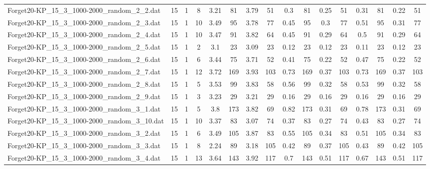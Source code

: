 \begin{sidewaystable}[!ht]
{\begin{tabular}{lccccccccccccccc}
Forget20-KP\_15\_3\_1000-2000\_random\_2\_2.dat & 15 & 1 & 8 & 3.21 & 81 & 3.79 & 51 & 0.3 & 81 & 0.25 & 51 & 0.31 & 81 &  \textcolor{blue2}{0.22} & 51 \\
Forget20-KP\_15\_3\_1000-2000\_random\_2\_3.dat & 15 & 1 & 10 & 3.49 & 95 & 3.78 & 77 & 0.45 & 95 &  \textcolor{blue2}{0.3} & 77 & 0.51 & 95 & 0.31 & 77 \\
Forget20-KP\_15\_3\_1000-2000\_random\_2\_4.dat & 15 & 1 & 10 & 3.47 & 91 & 3.82 & 64 & 0.45 & 91 &  \textcolor{blue2}{0.29} & 64 & 0.5 & 91 &  \textcolor{blue2}{0.29} & 64 \\
Forget20-KP\_15\_3\_1000-2000\_random\_2\_5.dat & 15 & 1 & 2 & 3.1 & 23 & 3.09 & 23 & 0.12 & 23 & 0.12 & 23 &  \textcolor{blue2}{0.11} & 23 & 0.12 & 23 \\
Forget20-KP\_15\_3\_1000-2000\_random\_2\_6.dat & 15 & 1 & 6 & 3.44 & 75 & 3.71 & 52 & 0.41 & 75 &  \textcolor{blue2}{0.22} & 52 & 0.47 & 75 &  \textcolor{blue2}{0.22} & 52 \\
Forget20-KP\_15\_3\_1000-2000\_random\_2\_7.dat & 15 & 1 & 12 & 3.72 & 169 & 3.93 & 103 & 0.73 & 169 &  \textcolor{blue2}{0.37} & 103 & 0.73 & 169 &  \textcolor{blue2}{0.37} & 103 \\
Forget20-KP\_15\_3\_1000-2000\_random\_2\_8.dat & 15 & 1 & 5 & 3.53 & 99 & 3.83 & 58 & 0.56 & 99 &  \textcolor{blue2}{0.32} & 58 & 0.53 & 99 &  \textcolor{blue2}{0.32} & 58 \\
Forget20-KP\_15\_3\_1000-2000\_random\_2\_9.dat & 15 & 1 & 3 & 3.23 & 29 & 3.21 & 29 &  \textcolor{blue2}{0.16} & 29 &  \textcolor{blue2}{0.16} & 29 &  \textcolor{blue2}{0.16} & 29 &  \textcolor{blue2}{0.16} & 29 \\
Forget20-KP\_15\_3\_1000-2000\_random\_3\_1.dat & 15 & 1 & 5 & 3.8 & 173 & 3.82 & 69 & 0.82 & 173 &  \textcolor{blue2}{0.31} & 69 & 0.78 & 173 &  \textcolor{blue2}{0.31} & 69 \\
Forget20-KP\_15\_3\_1000-2000\_random\_3\_10.dat & 15 & 1 & 10 & 3.37 & 83 & 3.07 & 74 & 0.37 & 83 &  \textcolor{blue2}{0.27} & 74 & 0.43 & 83 &  \textcolor{blue2}{0.27} & 74 \\
Forget20-KP\_15\_3\_1000-2000\_random\_3\_2.dat & 15 & 1 & 6 & 3.49 & 105 & 3.87 & 83 & 0.55 & 105 &  \textcolor{blue2}{0.34} & 83 & 0.51 & 105 &  \textcolor{blue2}{0.34} & 83 \\
Forget20-KP\_15\_3\_1000-2000\_random\_3\_3.dat & 15 & 1 & 8 & 2.24 & 89 & 3.18 & 105 & 0.42 & 89 &  \textcolor{blue2}{0.37} & 105 & 0.43 & 89 & 0.42 & 105 \\
Forget20-KP\_15\_3\_1000-2000\_random\_3\_4.dat & 15 & 1 & 13 & 3.64 & 143 & 3.92 & 117 & 0.7 & 143 & 0.51 & 117 & 0.67 & 143 & 0.51 & 117 \\

\end{tabular}}
\end{sidewaystable}
